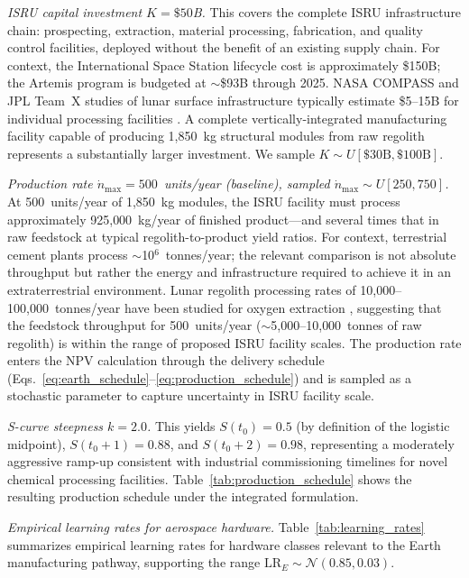 \documentclass[preprint,12pt]{elsarticle}
\begin{document}
\emph{ISRU capital investment $K = \$50$B.} This covers the complete ISRU infrastructure chain: prospecting, extraction, material processing, fabrication, and quality control facilities, deployed without the benefit of an existing supply chain. For context, the International Space Station lifecycle cost is approximately \$150B; the Artemis program is budgeted at $\sim$\$93B through 2025. NASA COMPASS and JPL Team~X studies of lunar surface infrastructure typically estimate \$5--15B for individual processing facilities \cite{sanders2015,nasa2015handbook}. A complete vertically-integrated manufacturing facility capable of producing 1{,}850~kg structural modules from raw regolith represents a substantially larger investment. We sample $K \sim U[\$30\text{B}, \$100\text{B}]$.

\emph{Production rate $\dot{n}_{\max} = 500$~units/year (baseline), sampled $\dot{n}_{\max} \sim U[250, 750]$.} At 500~units/year of 1{,}850~kg modules, the ISRU facility must process approximately 925{,}000~kg/year of finished product---and several times that in raw feedstock at typical regolith-to-product yield ratios. For context, terrestrial cement plants process $\sim$10$^6$~tonnes/year; the relevant comparison is not absolute throughput but rather the energy and infrastructure required to achieve it in an extraterrestrial environment. Lunar regolith processing rates of 10{,}000--100{,}000~tonnes/year have been studied for oxygen extraction \cite{sanders2015}, suggesting that the feedstock throughput for 500~units/year ($\sim$5{,}000--10{,}000~tonnes of raw regolith) is within the range of proposed ISRU facility scales. The production rate enters the NPV calculation through the delivery schedule (Eqs.~\ref{eq:earth_schedule}--\ref{eq:production_schedule}) and is sampled as a stochastic parameter to capture uncertainty in ISRU facility scale.

\emph{S-curve steepness $k = 2.0$.} This yields $S(t_0) = 0.5$ (by definition of the logistic midpoint), $S(t_0 + 1) = 0.88$, and $S(t_0 + 2) = 0.98$, representing a moderately aggressive ramp-up consistent with industrial commissioning timelines for novel chemical processing facilities. Table~\ref{tab:production_schedule} shows the resulting production schedule under the integrated formulation.

\emph{Empirical learning rates for aerospace hardware.} Table~\ref{tab:learning_rates} summarizes empirical learning rates for hardware classes relevant to the Earth manufacturing pathway, supporting the range $\mathrm{LR}_E \sim \mathcal{N}(0.85, 0.03)$.
\end{document}
